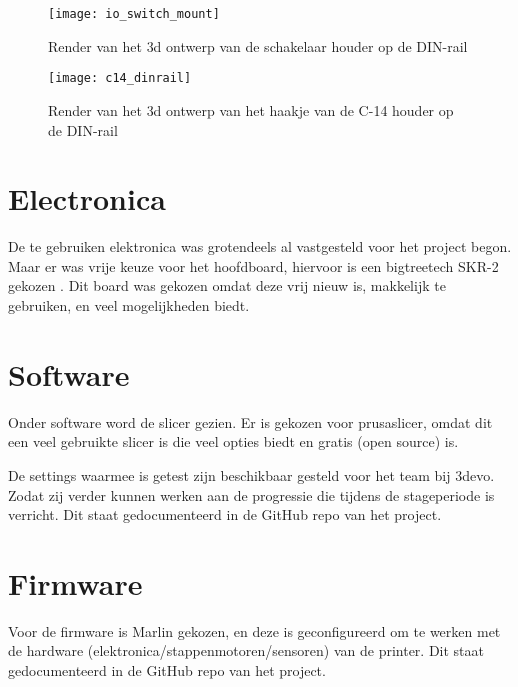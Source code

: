 \begin{figure}[h]
    \centering
    \begin{minipage}{0.45\textwidth}
        \centerline{\texttt{[image: io\_switch\_mount]}}
        \caption{Render van het \ac{3d} ontwerp van de schakelaar houder op de DIN-rail}
        \label{fig:din2}
    \end{minipage}\hfill
    \begin{minipage}{0.45\textwidth}
        \centerline{\texttt{[image: c14\_dinrail]}}
        \caption{Render van het \ac{3d} ontwerp van het haakje van de C-14 houder op de DIN-rail}
        \label{fig:din3}
    \end{minipage}
\end{figure}


\section{Electronica}

De te gebruiken elektronica was grotendeels al vastgesteld voor het project
begon. Maar er was vrije keuze voor het hoofdboard, hiervoor is een
bigtreetech SKR-2 gekozen \cite{btt}. Dit board was gekozen omdat deze vrij
nieuw is, makkelijk te gebruiken, en veel mogelijkheden biedt.

\section{Software}

Onder software word de slicer gezien. Er is gekozen voor prusaslicer, omdat dit
een veel gebruikte slicer is die veel opties biedt en gratis (open source) is.

De settings waarmee is getest zijn beschikbaar gesteld voor het team bij 3devo.
Zodat zij verder kunnen werken aan de progressie die tijdens de stageperiode is
verricht. Dit staat gedocumenteerd in de GitHub repo van het project.

\section{Firmware}

Voor de firmware is Marlin gekozen, en deze is geconfigureerd om te werken met
de hardware (elektronica/stappenmotoren/sensoren) van de printer. Dit staat
gedocumenteerd in de GitHub repo van het project.


